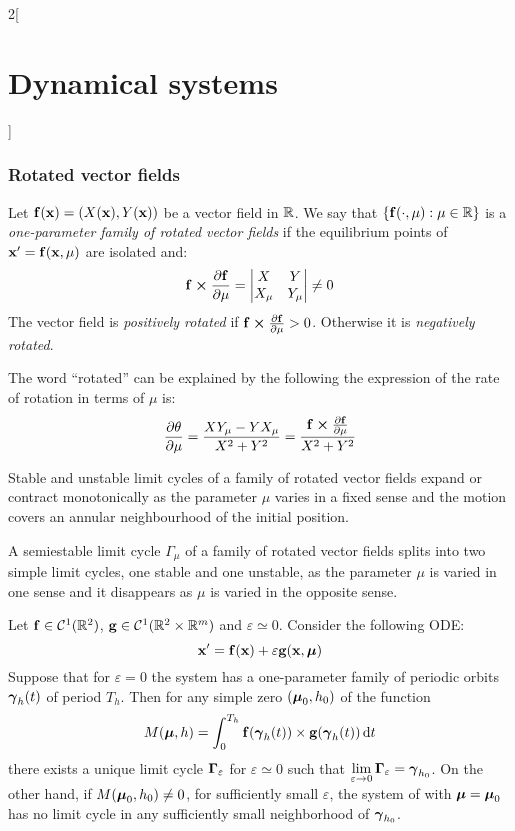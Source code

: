 \documentclass[../../../main_math.tex]{subfiles}
\begin{document}
\begin{multicols}{2}[\section{Dynamical systems}]
  \subsubsection{Rotated vector fields}
  \begin{definition}
    Let $\boldsymbol{\mathrm{f}}(\boldsymbol{\mathrm{x}})=(X(\boldsymbol{\mathrm{x}}),Y(\boldsymbol{\mathrm{x}}))$ be a vector field in $\mathbb{R}$. We say that $\{\boldsymbol{\mathrm{f}}(\cdot,\mu):\mu\in\mathbb{R}\}$ is a \emph{one-parameter family of rotated vector fields} if the equilibrium points of $\boldsymbol{\mathrm{x}}'=\boldsymbol{\mathrm{f}}(\boldsymbol{\mathrm{x}},\mu)$ are isolated and:
    $$\vf{f}\crossprod\pdv{\vf{f}}{\mu}=
      \begin{vmatrix}
        X     & Y     \\
        X_\mu & Y_\mu
      \end{vmatrix}\ne 0
    $$
    The vector field is \emph{positively rotated} if $\vf{f}\crossprod\pdv{\vf{f}}{\mu}>0$. Otherwise it is \emph{negatively rotated}.
  \end{definition}
  \begin{remark}
    The word ``rotated'' can be explained by the following the expression of the rate of rotation in terms of $\mu$ is:
    $$\pdv{\theta}{\mu}=\frac{XY_\mu-YX_\mu}{X^2+Y^2}=\frac{\vf{f}\crossprod\pdv{\vf{f}}{\mu}}{X^2+Y^2}$$
  \end{remark}
  \begin{theorem}
    Stable and unstable limit cycles of a family of rotated vector fields expand or contract monotonically as the parameter $\mu$ varies in a fixed sense and the motion covers an annular neighbourhood of the initial position.
  \end{theorem}
  \begin{theorem}
    A semiestable limit cycle $\Gamma_\mu$ of a family of rotated vector fields splits into two simple limit cycles, one stable and one unstable, as the parameter $\mu$ is varied in one sense and it disappears as $\mu$ is varied in the opposite sense.
  \end{theorem}
  \begin{theorem}
    Let $\boldsymbol{\mathrm{f}}\in\mathcal{C}^1(\mathbb{R}^2)$, $\boldsymbol{\mathrm{g}}\in\mathcal{C}^1(\mathbb{R}^2\times\mathbb{R}^m)$ and $\varepsilon\simeq 0$. Consider the following ODE:
    \begin{equation}\label{DS:melnikov}
      \boldsymbol{\mathrm{x}}'=\boldsymbol{\mathrm{f}}(\boldsymbol{\mathrm{x}})+\varepsilon\boldsymbol{\mathrm{g}}(\boldsymbol{\mathrm{x}},\boldsymbol{\mathrm{\mu}})
    \end{equation}
    Suppose that for $\varepsilon =0$ the system has a one-parameter family of periodic orbits $\boldsymbol{\mathrm{\gamma}}_h(t)$ of period $T_h$. Then for any simple zero $(\boldsymbol{\mathrm{\mu}}_0,h_0)$ of the function $$M(\boldsymbol{\mathrm{\mu}}, h)=\int_{0}^{T_h}\boldsymbol{\mathrm{f}}(\boldsymbol{\mathrm{\gamma}}_h(t))\times \boldsymbol{\mathrm{g}}(\boldsymbol{\mathrm{\gamma}}_h(t))\dd{t}$$ there exists a unique limit cycle $\boldsymbol{\mathrm{\Gamma}}_\varepsilon$ for $\varepsilon\simeq 0$ such that $\displaystyle\lim_{\varepsilon\to 0}\boldsymbol{\mathrm{\Gamma}}_\varepsilon=\boldsymbol{\mathrm{\gamma}}_{h_0}$. On the other hand, if $M(\boldsymbol{\mathrm{\mu}}_0,h_0)\ne 0$, for sufficiently small $\varepsilon$, the system of  with $\boldsymbol{\mathrm{\mu}}=\boldsymbol{\mathrm{\mu}}_0$ has no limit cycle in any sufficiently small neighborhood of $\boldsymbol{\mathrm{\gamma}}_{h_0}$.

\end{theorem}
\end{multicols}
\end{document}
